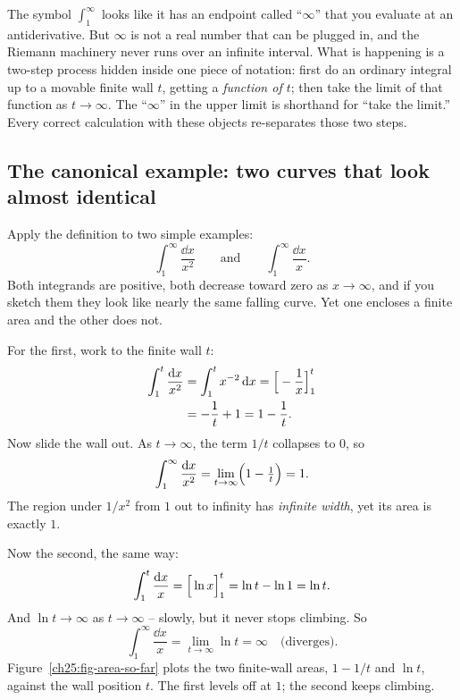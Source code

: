 \begin{happeningbox}
The symbol $\int_1^{\infty}$ looks like it has an endpoint called ``$\infty$'' that
you evaluate at an antiderivative. But $\infty$ is not a real number that can be plugged in, and the Riemann machinery never runs over an infinite interval. What is
happening is a two-step process hidden inside one piece of notation:
first do an ordinary integral up to a movable finite wall $t$, getting a
\emph{function of $t$}; then take the limit of that function as $t\to\infty$. The
``$\infty$'' in the upper limit is shorthand for ``take the limit.'' Every correct
calculation with these objects re-separates those two steps.
\end{happeningbox}

\subsection{The canonical example: two curves that look almost identical}
\label{ch25:canonical}

Apply the definition to two simple examples:
\[
  \int_1^{\infty} \frac{\dd x}{x^2}
  \qquad\text{and}\qquad
  \int_1^{\infty} \frac{\dd x}{x}.
\]
Both integrands are positive, both decrease toward zero as $x\to\infty$, and if
you sketch them they look like nearly the same falling curve. Yet one
encloses a finite area and the other does not.

For the first, work to the finite wall $t$:
\begin{align*}
  \int_1^{t} \frac{\mathrm{d} x}{x^2}
  &= \int_1^{t} x^{-2}\,\mathrm{d} x
   = \Big[-\frac{1}{x}\Big]_{1}^{t}\\
  &= -\frac{1}{t} + 1
   = 1 - \frac{1}{t}.
\end{align*}
Now slide the wall out. As $t\to\infty$, the term $1/t$ collapses to $0$, so
\[
  \int_1^{\infty} \frac{\mathrm{d} x}{x^2}
  = \lim_{t\to\infty}\Bigl(1 - \tfrac{1}{t}\Bigr) = 1.
\]
The region under $1/x^2$ from $1$ out to infinity has \emph{infinite width}, yet
its area is exactly $1$.

Now the second, the same way:
\[
  \int_1^{t} \frac{\mathrm{d} x}{x}
  = \Big[\ln x\Big]_{1}^{t}
  = \ln t - \ln 1 = \ln t.
\]
And $\ln t \to \infty$ as $t\to\infty$ -- slowly, but it never stops climbing. So
\[
  \int_1^{\infty} \frac{\dd x}{x} = \lim_{t\to\infty} \ln t = \infty
  \quad\text{(diverges).}
\]
Figure~\ref{ch25:fig-area-so-far} plots the two finite-wall areas, $1-1/t$ and
$\ln t$, against the wall position $t$. The first levels off at $1$; the second
keeps climbing.

